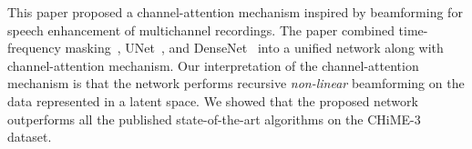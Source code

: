 \documentclass{article}
\begin{document}
This paper proposed a channel-attention mechanism inspired by beamforming for speech enhancement of multichannel recordings. The paper combined time-frequency masking~\cite{TFmask}, UNet~\cite{unet}, and DenseNet~\cite{denseNet} into a unified network along with channel-attention mechanism. Our interpretation of the channel-attention mechanism is that the network performs recursive \emph{non-linear} beamforming on the data represented in a latent space. We showed that the proposed network outperforms all the published state-of-the-art algorithms on the CHiME-3 dataset. 




\balance


\end{document}
